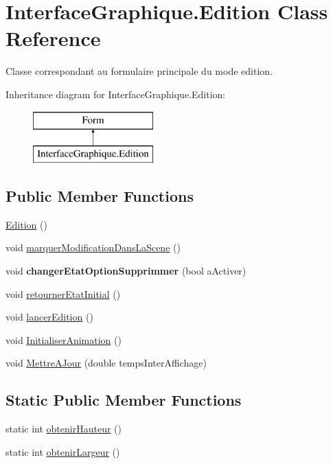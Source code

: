 \hypertarget{class_interface_graphique_1_1_edition}{}\section{Interface\+Graphique.\+Edition Class Reference}
\label{class_interface_graphique_1_1_edition}


Classe correspondant au formulaire principale du mode edition.  


Inheritance diagram for Interface\+Graphique.\+Edition\+:\begin{figure}[H]
\begin{center}
\leavevmode
\includegraphics[height=2.000000cm]{class_interface_graphique_1_1_edition}
\end{center}
\end{figure}
\subsection*{Public Member Functions}
\begin{DoxyCompactItemize}
\item 
\hyperlink{group__inf2990_gaf27d4a0baf5a55d5383c734caaca0627}{Edition} ()
\item 
void \hyperlink{group__inf2990_ga127e6281d56016e29c2d728a5269895f}{marquer\+Modification\+Dans\+La\+Scene} ()
\item 
void {\bfseries changer\+Etat\+Option\+Supprimmer} (bool a\+Activer)
\item 
void \hyperlink{group__inf2990_gacaa441d461a6dafd8c2c8931b00cf689}{retourner\+Etat\+Initial} ()
\item 
void \hyperlink{group__inf2990_ga5be11fa503e06bd8a549594dab9858b3}{lancer\+Edition} ()
\item 
void \hyperlink{group__inf2990_ga36fccefad6bf9be3fb751979799de906}{Initialiser\+Animation} ()
\item 
void \hyperlink{group__inf2990_ga9c082e311bc8dd83bdef34a670fecfe0}{Mettre\+A\+Jour} (double temps\+Inter\+Affichage)
\end{DoxyCompactItemize}
\subsection*{Static Public Member Functions}
\begin{DoxyCompactItemize}
\item 
static int \hyperlink{group__inf2990_ga0c985271a0f6bdf6375d3aac95f67f70}{obtenir\+Hauteur} ()
\item 
static int \hyperlink{group__inf2990_ga4cf2fe15ce71cea18daf36cf365402c8}{obtenir\+Largeur} ()
\end{DoxyCompactItemize}
